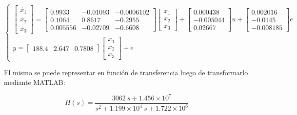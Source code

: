 \vspace{-0.5cm}
\begin{equation}
    \begin{cases}
        \begin{bmatrix}
            \dot{x_1}   \\
            \dot{x_2}   \\
            \dot{x_3}
        \end{bmatrix}
        =
        \begin{bmatrix}
            0.9933   &   -0.01093    &   -0.0006102\\
            0.1064   &   0.8617      &   -0.2955   \\
            0.005556 &   -0.02709    &   -0.6608            
        \end{bmatrix}
        \begin{bmatrix}
            x_1 \\
            x_2 \\
            x_3
        \end{bmatrix}
        +
        \begin{bmatrix}
            0.000438   \\
            -0.005044  \\
            0.02667
        \end{bmatrix}
        u 
        +
        \begin{bmatrix}
            0.002016 \\
            -0.0145   \\
            -0.008185
        \end{bmatrix}
        e
        \\
        y =
        \begin{bmatrix}
            188.4 & 2.647 & 0.7808
        \end{bmatrix}

        \begin{bmatrix}
            x_1 \\
            x_2 \\
            x_3
        \end{bmatrix}
        +
        e

    \end{cases}
\end{equation}

El mismo se puede representar en función de transferencia luego de transformarlo mediante MATLAB:

\vspace{-0.5cm}
\begin{equation}
    H(s) = \dfrac{3062\ s + 1.456 \times 10^7}{s^2 + 1.199 \times 10^4\ s + 1.722 \times 10^6}
\end{equation}
\vspace{-0.5cm}

